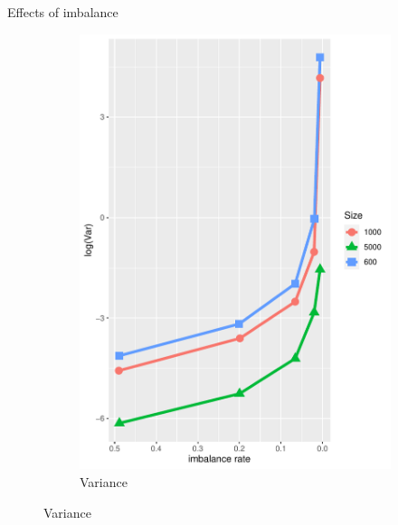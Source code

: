 \documentclass{beamer}
\begin{document}
\begin{frame}{Effects of imbalance}
\begin{figure}
\begin{subfigure}{0.47\textwidth}
		\includegraphics[width=\textwidth]{imbvar.pdf}
		\caption{Variance}
	\end{subfigure}
	\label{fig:imb}
	\end{figure}
        
    \end{frame}
    
\end{document}
